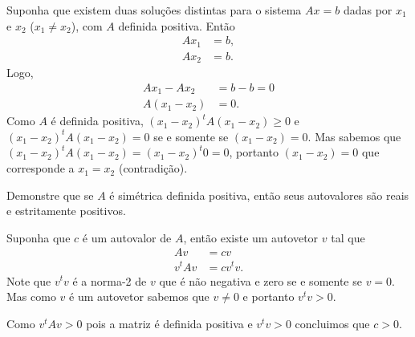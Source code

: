 \documentclass[a4paper,12pt, leqno, answers]{exam}
\begin{document}
\begin{questions}
\begin{solution}
        Suponha que existem duas solu\c{c}\~{o}es distintas para o sistema $A x = b$ dadas por $x_1$ e $x_2$ ($x_1 \neq x_2$), com $A$ definida positiva. Ent\~{a}o
        \begin{align*}
            A x_1 &= b, \\
            A x_2 &= b.
        \end{align*}
        Logo,
        \begin{align*}
            A x_1 - A x_2 &= b - b = 0 \\
            A (x_1 - x_2) &= 0.
        \end{align*}
        Como $A$ \'{e} definida positiva, $(x_1 - x_2)^t A (x_1 - x_2) \geq 0$ e $(x_1 - x_2)^t A (x_1 - x_2) = 0$ se e somente se $(x_1 - x_2) = 0$. Mas sabemos que $(x_1 - x_2)^t A (x_1 - x_2) = (x_1 - x_2)^t 0 = 0$, portanto $(x_1 - x_2) = 0$ que corresponde a $x_1 = x_2$ (contradi\c{c}\~{a}o).
    \end{solution}

    \question Demonstre que se $A$ \'{e} sim\'{e}trica definida positiva, ent\~{a}o seus autovalores s\~{a}o reais e estritamente positivos.
    \begin{solution}
        Suponha que $c$ \'{e} um autovalor de $A$, ent\~{a}o existe um autovetor $v$ tal que
        \begin{align*}
            A v &= c v \\
            v^t A v &= c v^t v.
        \end{align*}
        Note que $v^t v$ \'{e} a norma-2 de $v$ que \'{e} n\~{a}o negativa e zero se e somente se $v = 0$. Mas como $v$ \'{e} um autovetor sabemos que $v \neq 0$ e portanto $v^t v > 0$.

        Como $v^t A v > 0$ pois a matriz \'{e} definida positiva e $v^t v > 0$ concluimos que $c > 0$.
    \end{solution}


\end{questions}
\end{document}
